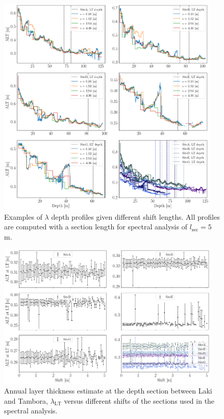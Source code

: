 \documentclass[../../CompleteThesis2/Complete_2ndDraft]{subfiles}
\begin{document}
\begin{figure}[h]
	\centering
	\includegraphics[width=0.95\textwidth]{AllCores_ALT_at_DiffShifts.png}
	\caption[$\lambda$ Depth Profiles, Different $s_{\text{sec}}$]{\small Examples of $\lambda$ depth profiles given different shift lengths. All profiles are computed with a section length for spectral analysis of $l_{\text{sec}}=5$ m.}
	\label{fig:AllCores_ALT_at_DiffShifts}
\end{figure}


\begin{figure}[h]
	\centering
	\includegraphics[width=0.95\textwidth]{AllCores_ALTvsShift.png}
	\caption[$\lambda_{\text{LT}}0$ vs. $s_{\text{sec}}$]{\small Annual layer thickness estimate at the depth section between Laki and Tambora, $\lambda_{\text{LT}}$ versus different shifts of the sections used in the spectral analysis.}
	\label{fig:AllCores_ALTvsShift}
\end{figure}
\end{document}
